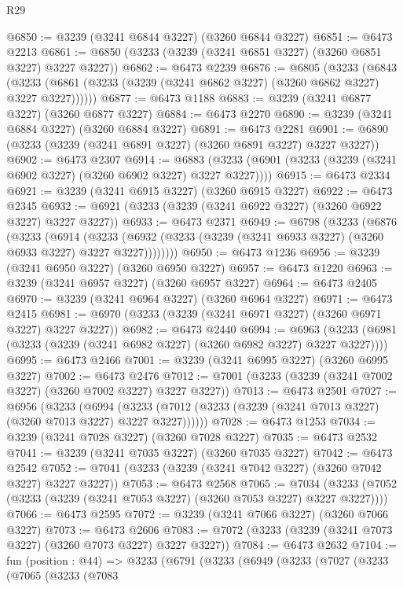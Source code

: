 \begin{lexlean}{R29}
\begin{coremodule}
@6850 := @3239 (@3241 @6844 @3227) (@3260 @6844 @3227)
@6851 := @6473 @2213
@6861 := @6850 (@3233 (@3239 (@3241 @6851 @3227) (@3260 @6851 @3227) @3227 @3227))
@6862 := @6473 @2239
@6876 := @6805
    (@3233
      (@6843 (@3233 (@6861 (@3233 (@3239 (@3241 @6862 @3227) (@3260 @6862 @3227) @3227 @3227))))))
@6877 := @6473 @1188
@6883 := @3239 (@3241 @6877 @3227) (@3260 @6877 @3227)
@6884 := @6473 @2270
@6890 := @3239 (@3241 @6884 @3227) (@3260 @6884 @3227)
@6891 := @6473 @2281
@6901 := @6890 (@3233 (@3239 (@3241 @6891 @3227) (@3260 @6891 @3227) @3227 @3227))
@6902 := @6473 @2307
@6914 := @6883 (@3233 (@6901 (@3233 (@3239 (@3241 @6902 @3227) (@3260 @6902 @3227) @3227 @3227))))
@6915 := @6473 @2334
@6921 := @3239 (@3241 @6915 @3227) (@3260 @6915 @3227)
@6922 := @6473 @2345
@6932 := @6921 (@3233 (@3239 (@3241 @6922 @3227) (@3260 @6922 @3227) @3227 @3227))
@6933 := @6473 @2371
@6949 := @6798
    (@3233
      (@6876
        (@3233
          (@6914
            (@3233 (@6932 (@3233 (@3239 (@3241 @6933 @3227) (@3260 @6933 @3227) @3227 @3227))))))))
@6950 := @6473 @1236
@6956 := @3239 (@3241 @6950 @3227) (@3260 @6950 @3227)
@6957 := @6473 @1220
@6963 := @3239 (@3241 @6957 @3227) (@3260 @6957 @3227)
@6964 := @6473 @2405
@6970 := @3239 (@3241 @6964 @3227) (@3260 @6964 @3227)
@6971 := @6473 @2415
@6981 := @6970 (@3233 (@3239 (@3241 @6971 @3227) (@3260 @6971 @3227) @3227 @3227))
@6982 := @6473 @2440
@6994 := @6963 (@3233 (@6981 (@3233 (@3239 (@3241 @6982 @3227) (@3260 @6982 @3227) @3227 @3227))))
@6995 := @6473 @2466
@7001 := @3239 (@3241 @6995 @3227) (@3260 @6995 @3227)
@7002 := @6473 @2476
@7012 := @7001 (@3233 (@3239 (@3241 @7002 @3227) (@3260 @7002 @3227) @3227 @3227))
@7013 := @6473 @2501
@7027 := @6956
    (@3233
      (@6994 (@3233 (@7012 (@3233 (@3239 (@3241 @7013 @3227) (@3260 @7013 @3227) @3227 @3227))))))
@7028 := @6473 @1253
@7034 := @3239 (@3241 @7028 @3227) (@3260 @7028 @3227)
@7035 := @6473 @2532
@7041 := @3239 (@3241 @7035 @3227) (@3260 @7035 @3227)
@7042 := @6473 @2542
@7052 := @7041 (@3233 (@3239 (@3241 @7042 @3227) (@3260 @7042 @3227) @3227 @3227))
@7053 := @6473 @2568
@7065 := @7034 (@3233 (@7052 (@3233 (@3239 (@3241 @7053 @3227) (@3260 @7053 @3227) @3227 @3227))))
@7066 := @6473 @2595
@7072 := @3239 (@3241 @7066 @3227) (@3260 @7066 @3227)
@7073 := @6473 @2606
@7083 := @7072 (@3233 (@3239 (@3241 @7073 @3227) (@3260 @7073 @3227) @3227 @3227))
@7084 := @6473 @2632
@7104 := fun (position : @44) =>
  @3233
    (@6791
      (@3233
        (@6949
          (@3233
            (@7027
              (@3233
                (@7065
                  (@3233
                    (@7083

\end{coremodule}
\end{lexlean}
